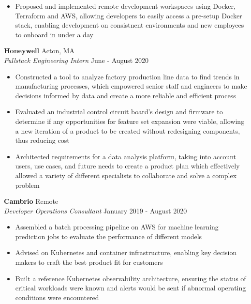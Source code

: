 \documentclass[10pt]{article}
\begin{document}
\begin{flushleft}
\begin{itemize}
        \item Proposed and implemented remote development workspaces using Docker, Terraform and AWS, allowing developers to easily access a pre-setup Docker stack, enabling development on consistnent environments and new employees to onboard in under a day 
	\end{itemize}

	\textbf{Honeywell} \hfill Acton, MA \\
	\textit{Fullstack Engineering Intern} \hfill June - August 2020 \\
    \begin{itemize}
        \item Constructed a tool to analyze factory production line data to find trends in manufacturing processes, which empowered senior staff and engineers to make decisions informed by data and create a more reliable and efficient process

		\item Evaluated an industrial control circuit board's design and firmware to determine if any opportunities for feature set expansion were viable, allowing a new iteration of a product to be created without redesigning components, thus reducing cost

		\item Architected requirements for a data analysis platform, taking into account users, use cases, and future needs to create a product plan which effectively allowed a variety of different specialists to collaborate and solve a complex problem
    \end{itemize}

	\textbf{Cambrio} \hfill Remote \\
	\textit{Developer Operations Consultant} \hfill January 2019 - August 2020  \\
	\begin{itemize}
		\item Assembled a batch processing pipeline on AWS for machine learning prediction jobs to evaluate the performance of different models
		\item Advised on Kubernetes and container infrastructure, enabling key decision makers to craft the best product fit for customers
		\item Built a reference Kubernetes observability architecture, ensuring the status of critical workloads were known and alerts would be sent if abnormal operating conditions were encountered
	\end{itemize}


\end{flushleft}
\end{document}
